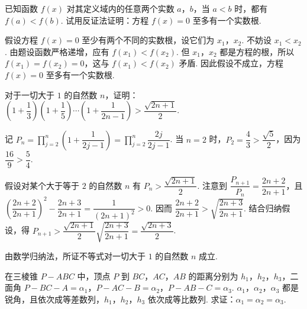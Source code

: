 \begin{problem}

已知函数 \(f(x)\) 对其定义域内的任意两个实数 \(a\)，\(b\)，当 \(a<b\) 时，都有 \(f(a)<f(b)\). 试用反证法证明：方程 \(f(x)=0\) 至多有一个实数根.
\end{problem}

\begin{solution}
假设方程 \(f(x)=0\) 至少有两个不同的实数根，设它们为 \(x_1\)，\(x_2\). 不妨设 \(x_1<x_2\). 由题设函数严格递增，应有 \(f(x_1)<f(x_2)\). 但 \(x_1\)，\(x_2\) 都是方程的根，所以 \(f(x_1)=f(x_2)=0\)，这与 \(f(x_1)<f(x_2)\) 矛盾. 因此假设不成立，方程 \(f(x)=0\) 至多有一个实数根.
\end{solution}

\begin{problem}

对于一切大于 \(1\) 的自然数 \(n\)，证明：\(\left(1+\dfrac{1}{3}\right)\left(1+\dfrac{1}{5}\right)\cdots\left(1+\dfrac{1}{2n-1}\right)>\dfrac{\sqrt{2n+1}}{2}\).
\end{problem}

\begin{solution}
记 \(P_n=\displaystyle\prod_{j=2}^{n}\left(1+\dfrac{1}{2j-1}\right)=\prod_{j=2}^{n}\dfrac{2j}{2j-1}\). 当 \(n=2\) 时，\(P_2=\dfrac43>\dfrac{\sqrt5}{2}\)，因为 \(\dfrac{16}{9}>\dfrac54\).

假设对某个大于等于 \(2\) 的自然数 \(n\) 有 \(P_n>\dfrac{\sqrt{2n+1}}{2}\). 注意到
\(\dfrac{P_{n+1}}{P_n}=\dfrac{2n+2}{2n+1}\)，且
\(\left(\dfrac{2n+2}{2n+1}\right)^2-\dfrac{2n+3}{2n+1}=\dfrac{1}{(2n+1)^2}>0\). 因而 \(\dfrac{2n+2}{2n+1}>\sqrt{\dfrac{2n+3}{2n+1}}\). 结合归纳假设，得
\(P_{n+1}>\dfrac{\sqrt{2n+1}}{2}\sqrt{\dfrac{2n+3}{2n+1}}=\dfrac{\sqrt{2n+3}}{2}\).

由数学归纳法，所证不等式对一切大于 \(1\) 的自然数 \(n\) 成立.
\end{solution}

\begin{problem}

在三棱锥 \(P-ABC\) 中，顶点 \(P\) 到 \(BC\)，\(AC\)，\(AB\) 的距离分别为 \(h_1\)，\(h_2\)，\(h_3\)，二面角 \(P-BC-A=\alpha_1\)，\(P-AC-B=\alpha_2\)，\(P-AB-C=\alpha_3\). \(\alpha_1\)，\(\alpha_2\)，\(\alpha_3\) 都是锐角，且依次成等差数列，\(h_1\)，\(h_2\)，\(h_3\) 依次成等比数列. 求证：\(\alpha_1=\alpha_2=\alpha_3\).
\end{problem}

